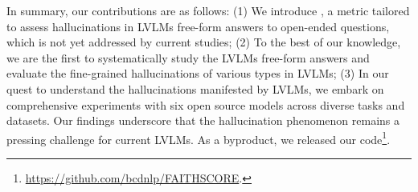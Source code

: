 In summary, our contributions are as follows: 
(1) We introduce \ours, a metric tailored to assess hallucinations in LVLMs free-form answers to open-ended questions, which is not yet addressed by current studies; 
(2) To the best of our knowledge, we are the first to systematically study the LVLMs free-form answers and evaluate the fine-grained hallucinations of various types in LVLMs; 
(3) In our quest to understand the hallucinations manifested by LVLMs, we embark on comprehensive experiments with six open source models across diverse tasks and datasets. Our findings underscore that the hallucination phenomenon remains a pressing challenge for current LVLMs. As a byproduct, we released our code\footnote{\url{https://github.com/bcdnlp/FAITHSCORE}.}.

